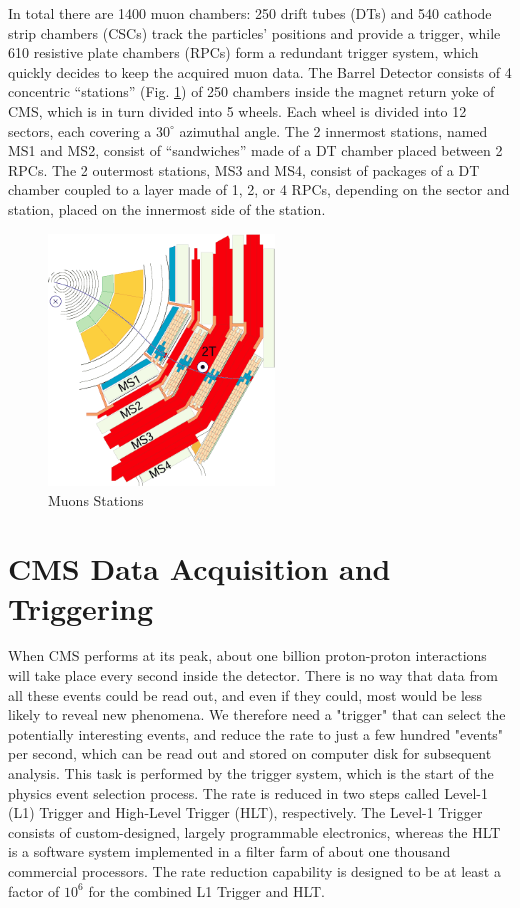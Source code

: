 In total there are 1400 muon chambers: 250 drift tubes (DTs) and 540 cathode strip chambers (CSCs) track the particles’ positions and provide a trigger, while 610 resistive plate chambers (RPCs) form a redundant trigger system, which quickly decides to keep the acquired muon data. The Barrel Detector consists of 4 concentric “stations” (Fig. \ref{fig:mustations}) of 250 chambers inside the magnet return yoke of CMS, which is in turn divided into 5 wheels. Each wheel is divided into 12 sectors, each covering a $30^{\circ}$ azimuthal angle. The 2 innermost stations, named MS1 and MS2, consist of “sandwiches” made of a DT chamber placed between 2 RPCs. The 2 outermost stations, MS3 and MS4, consist of packages of a DT chamber coupled to a layer made of 1, 2, or 4 RPCs, depending on the sector and station, placed on the innermost side of the station.

\begin{figure}[H]
  \caption{Muons Stations \label{fig:mustations}}
  \centering
\includegraphics[width=6cm]{CMS_chapter_plots/mustations}
\end{figure}

\section{CMS Data Acquisition and Triggering}\label{triggerbase}

When CMS performs at its peak, about one billion proton-proton interactions will take place every second inside the detector. There is no way that data from all these events could be read out, and even if they could, most would be less likely to reveal new phenomena. We therefore need a "trigger" that can select the potentially interesting events, and reduce the rate to just a few hundred "events" per second, which can be read out and stored on computer disk for subsequent analysis. This task is performed by the trigger system, which is the start of the physics event selection process. The rate is reduced in two steps called Level-1 (L1) Trigger and High-Level Trigger (HLT), respectively. The Level-1 Trigger consists of custom-designed, largely programmable electronics, whereas the HLT is a software system implemented in a filter farm of about one thousand commercial processors. The rate reduction capability is designed to be at least a factor of $10^{6}$ for the combined L1 Trigger and HLT. 

